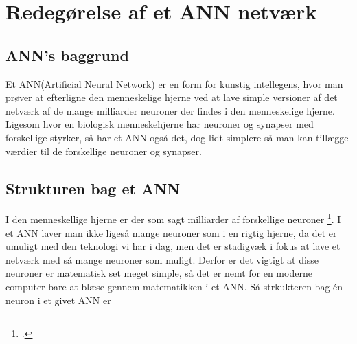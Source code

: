 \section{Redegørelse af et ANN netværk}

\subsection{ANN's baggrund}
Et ANN(Artificial Neural Network) er en form for kunstig intellegens, hvor man prøver at efterligne den menneskelige hjerne
ved at lave simple versioner af det netværk af de mange milliarder neuroner der findes i den menneskelige hjerne.
Ligesom hvor en biologisk menneskehjerne har neuroner og synapser med forskellige styrker, så har et ANN også det, dog lidt simplere
så man kan tillægge værdier til de forskellige neuroner og synapser.

\subsection{Strukturen bag et ANN}
I den menneskellige hjerne er der som sagt milliarder af forskellige neuroner \footcite{DDOhjerne}.
I et ANN laver man ikke ligeså mange
neuroner som i en rigtig hjerne, da det er umuligt med den teknologi vi har i dag, men det er stadigvæk i fokus at lave et netværk med så mange neuroner
som muligt. Derfor er det vigtigt at disse neuroner er matematisk set meget simple, så det er nemt for en moderne computer bare at blæse gennem matematikken
i et ANN. Så strkukteren bag én neuron i et givet ANN er



